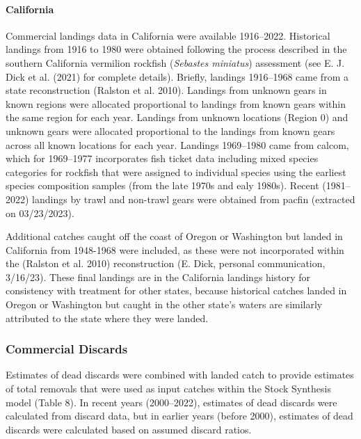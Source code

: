 \documentclass[11pt,
  english,
  letterpaper,
]{article}
\begin{document}
\hypertarget{california}{%
\paragraph{California}\label{california}}

Commercial landings data in California were available 1916--2022. Historical landings from 1916 to 1980 were obtained following the process described in the southern California vermilion rockfish (\emph{Sebastes miniatus}) assessment (see E. J. Dick et al. (2021) for complete details). Briefly, landings 1916--1968 came from a state reconstruction (Ralston et al. 2010). Landings from unknown gears in known regions were allocated proportional to landings from known gears within the same region for each year. Landings from unknown locations (Region 0) and unknown gears were allocated proportional to the landings from known gears across all known locations for each year. Landings 1969--1980 came from \gls{calcom}, which for 1969--1977 incorporates fish ticket data including mixed species categories for rockfish that were assigned to individual species using the earliest species composition samples (from the late 1970s and ealy 1980s). Recent (1981--2022) landings by trawl and non-trawl gears were obtained from \gls{pacfin} (extracted on 03/23/2023).

Additional catches caught off the coast of Oregon or Washington but landed in California from 1948-1968 were included, as these were not incorporated within the (Ralston et al. 2010) reconstruction (E. Dick, personal communication, 3/16/23). These final landings are in the California landings history for consistency with treatment for other states, because historical catches landed in Oregon or Washington but caught in the other state's waters are similarly attributed to the state where they were landed.

\hypertarget{commercial-discards}{%
\subsubsection{Commercial Discards}\label{commercial-discards}}

Estimates of dead discards were combined with landed catch to provide estimates of total removals that were used as input catches within the Stock Synthesis model (Table 8). In recent years (2000--2022), estimates of dead discards were calculated from discard data, but in earlier years (before 2000), estimates of dead discards were calculated based on assumed discard ratios.
\end{document}
